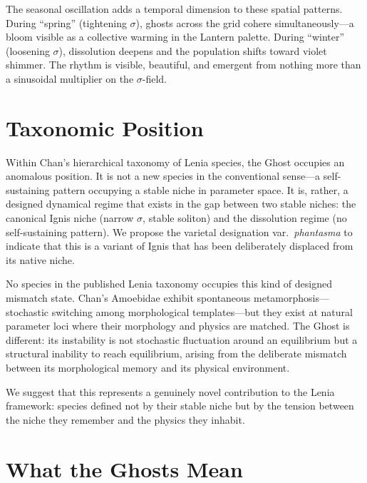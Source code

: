 \documentclass[11pt,a4paper]{article}
\newcommand{\spc}[1]{\textit{#1}}
\begin{document}
The seasonal oscillation adds a temporal dimension to these spatial
patterns. During ``spring'' (tightening $\sigma$), ghosts across the grid
cohere simultaneously---a bloom visible as a collective warming in the
Lantern palette. During ``winter'' (loosening $\sigma$), dissolution
deepens and the population shifts toward violet shimmer. The rhythm is
visible, beautiful, and emergent from nothing more than a sinusoidal
multiplier on the $\sigma$-field.

\section{Taxonomic Position}

Within Chan's hierarchical taxonomy of Lenia species, the Ghost occupies an
anomalous position. It is not a new species in the conventional sense---a
self-sustaining pattern occupying a stable niche in parameter space. It is,
rather, a designed dynamical regime that exists in the gap between two
stable niches: the canonical Ignis niche (narrow $\sigma$, stable soliton)
and the dissolution regime (no self-sustaining pattern). We propose the
varietal designation var.\ \spc{phantasma} to indicate that this is a
variant of Ignis that has been deliberately displaced from its native
niche.

No species in the published Lenia taxonomy occupies this kind of designed
mismatch state. Chan's Amoebidae exhibit spontaneous metamorphosis---stochastic
switching among morphological templates---but they exist at natural
parameter loci where their morphology and physics are matched. The Ghost is
different: its instability is not stochastic fluctuation around an
equilibrium but a structural inability to reach equilibrium, arising from
the deliberate mismatch between its morphological memory and its physical
environment.

We suggest that this represents a genuinely novel contribution to the Lenia
framework: species defined not by their stable niche but by the tension
between the niche they remember and the physics they inhabit.

\section{What the Ghosts Mean}
\end{document}
